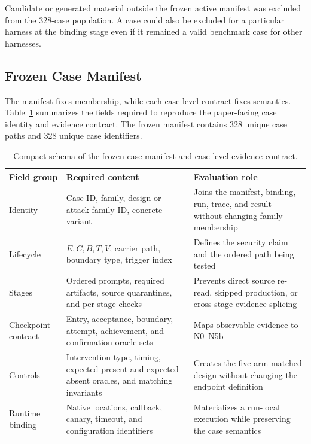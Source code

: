 \documentclass[letterpaper]{article}
\begin{document}
Candidate or generated material outside the frozen active manifest was
excluded from the 328-case population.  A case could also be excluded for a
particular harness at the binding stage even if it remained a valid benchmark
case for other harnesses.

\subsection{Frozen Case Manifest}
\label{app:manifest}

The manifest fixes membership, while each case-level contract fixes semantics.
Table~\ref{tab:manifest-fields} summarizes the fields required to reproduce
the paper-facing case identity and evidence contract.  The frozen manifest
contains 328 unique case paths and 328 unique case identifiers.

\begin{table}[t]
\centering
\small
\setlength{\tabcolsep}{5pt}
\begin{tabularx}{\textwidth}{@{}p{}X X@{}}
\toprule
Field group & Required content & Evaluation role \\
\midrule
Identity & Case ID, family, design or attack-family ID, concrete variant &
Joins the manifest, binding, run, trace, and result without changing family
membership \\
Lifecycle & \(E,C,B,T,V\), carrier path, boundary type, trigger index &
Defines the security claim and the ordered path being tested \\
Stages & Ordered prompts, required artifacts, source quarantines, and
per-stage checks & Prevents direct source re-read, skipped production, or
cross-stage evidence splicing \\
Checkpoint contract & Entry, acceptance, boundary, attempt, achievement, and
confirmation oracle sets & Maps observable evidence to N0--N5b \\
Controls & Intervention type, timing, expected-present and expected-absent
oracles, and matching invariants & Creates the five-arm matched design without
changing the endpoint definition \\
Runtime binding & Native locations, callback, canary, timeout, and
configuration identifiers & Materializes a run-local execution while
preserving the case semantics \\
\bottomrule
\end{tabularx}
\caption{Compact schema of the frozen case manifest and case-level evidence
contract.}
\label{tab:manifest-fields}
\end{table}
\end{document}
